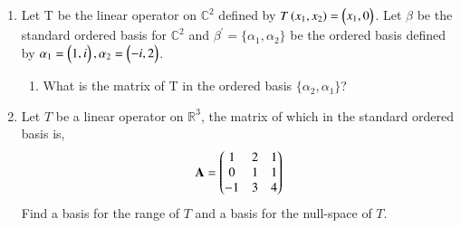 \renewcommand{\theequation}{\theenumi}
\renewcommand{\thefigure}{\theenumi}
\begin{enumerate}[label=\thesubsection.\arabic*.,ref=\thesubsection.\theenumi]
%
\item Let T be the linear operator on $\mathbb{C}^{2}$ defined by $T\left(x_1 , x_2\right)=\begin{pmatrix}x_1 , 0\end{pmatrix}$.
Let $\beta$ be the standard ordered basis for $\mathbb{C}^{2}$ and $\beta^{'}=\{\alpha_1 , \alpha_2\}$
be the ordered basis defined by $\alpha_1 = \begin{pmatrix}1 , i\end{pmatrix} , \alpha_2 = \begin{pmatrix}-i , 2\end{pmatrix}$.
\begin{enumerate}
\item What is the matrix of T in the ordered basis $\{\alpha_2,\alpha_1\}$?
%
%
\\
\solution

\end{enumerate}
%
\item Let $T$ be a linear operator on $\mathbb{R}^3$, the matrix of which in the standard ordered basis is,
\begin{align}
\mathbf{A} = \begin{pmatrix}1&2&1\\0&1&1\\-1&3&4\end{pmatrix} 
\end{align}
Find a basis for the range of $T$ and a basis for the null-space of $T$.
%
\\
\solution


\end{enumerate}
